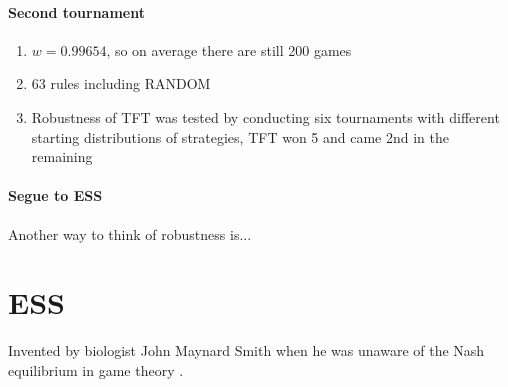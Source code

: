 \subsubsection{Second tournament}
\begin{enumerate}
\item $w = 0.99654$, so on average there are still 200 games
\item 63 rules including RANDOM
\item Robustness of TFT was tested by conducting six tournaments with different starting distributions of strategies, TFT won 5 and came 2nd in the remaining
\end{enumerate}

\subsubsection{Segue to ESS}
Another way to think of robustness is...


\chapter{ESS}
Invented by biologist John Maynard Smith when he was unaware of the Nash equilibrium in game theory \cite[p.53]{nowak2006evolutionary}.






